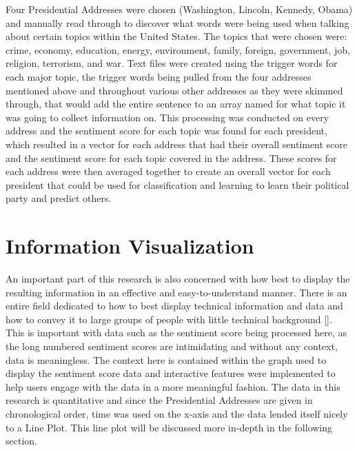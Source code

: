 Four Presidential Addresses were chosen (Washington, Lincoln, Kennedy, Obama) and manually read through to discover what words were being used when talking about certain topics within the United States. The topics that were chosen were: crime, economy, education, energy, environment, family, foreign, government, job, religion, terrorism, and war. Text files were created using the trigger words for each major topic, the trigger words being pulled from the four addresses mentioned above and throughout various other addresses as they were skimmed through, that would add the entire sentence to an array named for what topic it was going to collect information on. This processing was conducted on every address and the sentiment score for each topic was found for each president, which resulted in a vector for each address that had their overall sentiment score and the sentiment score for each topic covered in the address. These scores for each address were then averaged together to create an overall vector for each president that could be used for classification and learning to learn their political party and predict others.

\section{Information Visualization}
An important part of this research is also concerned with how best to display the resulting information in an effective and easy-to-understand manner.
There is an entire field dedicated to how to best display technical information and data and how to convey it to large groups of people with little technical background [\cite{fekete2008value}].
This is important with data such as the sentiment score being processed here, as the long numbered sentiment scores are intimidating and without any context, data is meaningless.
The context here is contained within the graph used to display the sentiment score data and interactive features were implemented to help users engage with the data in a more meaningful fashion.
The data in this research is quantitative and since the Presidential Addresses are given in chronological order, time was used on the x-axis and the data lended itself nicely to a Line Plot.
This line plot will be discussed more in-depth in the following section.

